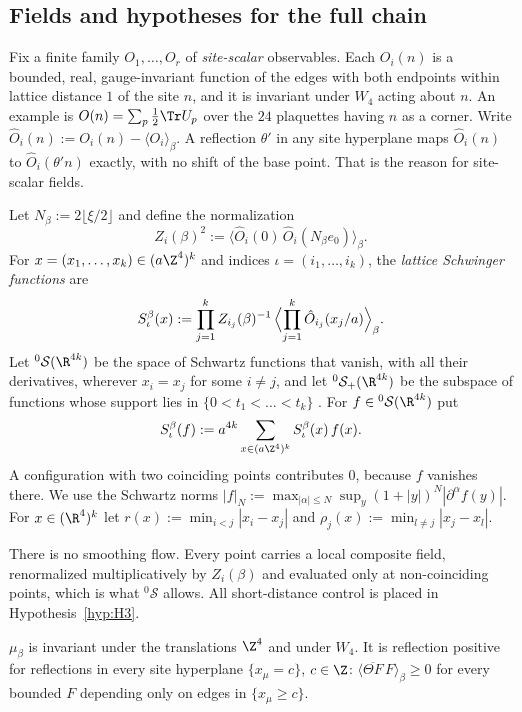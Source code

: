 \subsection{Fields and hypotheses for the full chain}\label{red:S-setting}

Fix a finite family $O_1,\dots,O_r$ of \emph{site-scalar} observables. Each $O_i(n)$ is a bounded, real, gauge-invariant function of the edges with both endpoints within lattice distance $1$ of the site $n$, and it is invariant under $W_4$ acting about $n$. An example is $O(n)=\sum_p\tfrac12\Tr U_p$ over the $24$ plaquettes having $n$ as a corner. Write $\hat O_i(n):=O_i(n)-\langle O_i\rangle_\beta$. A reflection $\theta'$ in any site hyperplane maps $\hat O_i(n)$ to $\hat O_i(\theta'n)$ exactly, with no shift of the base point. That is the reason for site-scalar fields.

Let $N_\beta:=2\lfloor\xi/2\rfloor$ and define the normalization
\[
  Z_i(\beta)^2:=\langle\hat O_i(0)\,\hat O_i(N_\beta e_0)\rangle_\beta .
\]
For $x=(x_1,\dots,x_k)\in(a\Z^4)^k$ and indices $\iota=(i_1,\dots,i_k)$, the \emph{lattice Schwinger functions} are
\begin{equation}\label{red:Sbeta}
  S^\beta_\iota(x):=\prod_{j=1}^k Z_{i_j}(\beta)^{-1}\,\Bigl\langle\prod_{j=1}^k\hat O_{i_j}(x_j/a)\Bigr\rangle_\beta .
\end{equation}
Let ${}^0\mathcal S(\R^{4k})$ be the space of Schwartz functions that vanish, with all their derivatives, wherever $x_i=x_j$ for some $i\ne j$, and let ${}^0\mathcal S_+(\R^{4k})$ be the subspace of functions whose support lies in $\{0<t_1<\dots<t_k\}$ \cite[eq.~(2.25)]{KQR21}. For $f\in{}^0\mathcal S(\R^{4k})$ put
\[
  S^\beta_\iota(f):=a^{4k}\sum_{x\in(a\Z^4)^k}S^\beta_\iota(x)\,f(x).
\]
A configuration with two coinciding points contributes $0$, because $f$ vanishes there. We use the Schwartz norms $|f|_N:=\max_{|\alpha|\le N}\sup_y(1+|y|)^N|\partial^\alpha f(y)|$. For $x\in(\R^4)^k$ let $r(x):=\min_{i<j}|x_i-x_j|$ and $\rho_j(x):=\min_{l\ne j}|x_j-x_l|$.

There is no smoothing flow. Every point carries a local composite field, renormalized multiplicatively by $Z_i(\beta)$ and evaluated only at non-coinciding points, which is what ${}^0\mathcal S$ allows. All short-distance control is placed in Hypothesis~\ref{hyp:H3}.

\begin{hypothesis}\label{hyp:H0}
$\mu_\beta$ is invariant under the translations $\Z^4$ and under $W_4$. It is reflection positive for reflections in every site hyperplane $\{x_\mu=c\}$, $c\in\Z$: $\langle\overline{\Theta F}\,F\rangle_\beta\ge0$ for every bounded $F$ depending only on edges in $\{x_\mu\ge c\}$.
\end{hypothesis}

